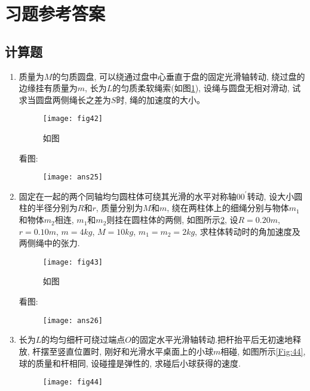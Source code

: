 \section{习题参考答案}
\subsection*{计算题}
\begin{enumerate}
    \item 质量为$M$的匀质圆盘, 可以绕通过盘中心垂直于盘的固定光滑轴转动, 
    绕过盘的边缘挂有质量为$m$, 长为$L$的匀质柔软绳索(如图\ref{Fig:42}), 
    设绳与圆盘无相对滑动, 试求当圆盘两侧绳长之差为$S$时, 
    绳的加速度的大小。
    \begin{figure}[h]
        \centering
        \texttt{[image: fig42]}
        \caption{如图}\label{Fig:42}
    \end{figure}
    \begin{solution}
        看图: 
        \begin{figure}[H]
            \centering
            \texttt{[image: ans25]}
        \end{figure}
    \end{solution}  
    \item 固定在一起的两个同轴均匀圆柱体可绕其光滑的水平对称轴$00^{'}$转动, 设大小圆柱的半径分别为$R$和$r$, 
    质量分别为$M$和$m$, 绕在两柱体上的细绳分别与物体$m_1$和物体$m_2$相连, $m_1$和$m_2$则挂在圆柱体的两侧, 如图所示\ref{Fig:43}, 
    设$R=0.20m$, $r=0.10m$, $m=4kg$, $M=10kg$, $m_1=m_2=2kg$, 求柱体转动时的角加速度及两侧绳中的张力.
    \begin{figure}[h]
        \centering
        \texttt{[image: fig43]}
        \caption{如图}\label{Fig:43}
    \end{figure}
    \begin{solution}
        看图: 
        \begin{figure}[H]
            \centering
            \texttt{[image: ans26]}
        \end{figure}
    \end{solution}  
    \item 长为$L$的均匀细杆可绕过端点$O$的固定水平光滑轴转动.把杆抬平后无初速地释放, 杆摆至竖直位置时, 刚好和光滑水平桌面上的小球$m$相碰, 如图所示\ref{Fig:44}, 
    球的质量和杆相同, 设碰撞是弹性的, 求碰后小球获得的速度.
    \begin{figure}[H]
        \centering
        \texttt{[image: fig44]}

\end{figure}
\end{enumerate}

